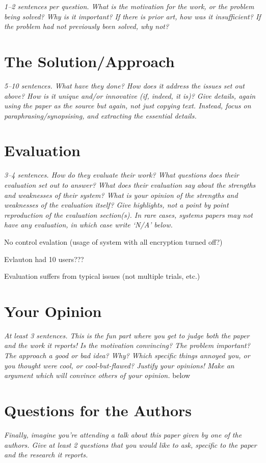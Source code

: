\documentclass[11pt]{article}
\begin{document}
\textsl{1--2 sentences per question. What is the motivation for the work, or
the problem being solved? Why is it important? If there is prior art, how was
it insufficient? If the problem had not previously been solved, why not?}



\section*{The Solution/Approach}

\textsl{5--10 sentences. What have they done? How does it address the issues
set out above? How is it unique and/or innovative (if, indeed, it is)? Give
details, again using the paper as the source but again, not just copying text.
Instead, focus on paraphrasing/synopsising, and extracting the essential
details.}


\section*{Evaluation}

\textsl{3--4 sentences. How do they evaluate their work? What questions does
their evaluation set out to answer? What does their evaluation say about the
strengths and weaknesses of their system? What is your opinion of the strengths
and weaknesses of the evaluation itself? Give highlights, not a point by point
reproduction of the evaluation section(s). In rare cases, systems papers may
not have any evaluation, in which case write `N/A' below.}

\item No control evalation (usage of system with all encryption turned off?)

\item Evlauton had 10 users???

\item Evaluation suffers from typical issues (not multiple trials, etc.)


\section*{Your Opinion}

\textsl{At least 3 sentences. This is the fun part where you get to judge both
the paper and the work it reports! Is the motivation convincing? The problem
important? The approach a good or bad idea? Why? Which specific things annoyed
you, or you thought were cool, or cool-but-flawed? Justify your opinions! Make
an argument which will convince others of your opinion.}
below


\section*{Questions for the Authors}

\textsl{Finally, imagine you're attending a talk about this paper given by one
of the authors. Give at least 2 questions that you would like to ask, specific
to the paper and the research it reports.}




\end{document}
